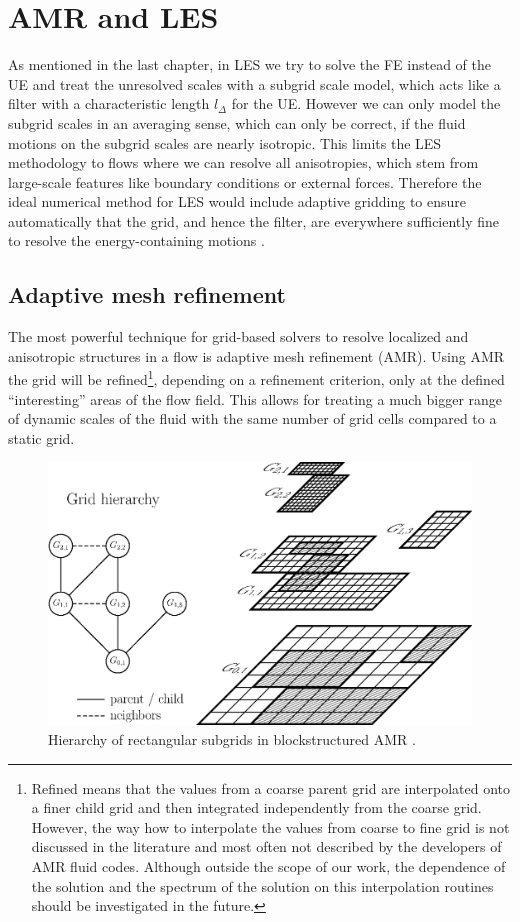 \chapter{AMR and LES}\label{amrles}
As mentioned in the last chapter, in LES we try to solve the FE
instead of the UE and treat the unresolved scales with a subgrid scale model,
which acts like a filter with a characteristic length $l_{\Delta}$ for the UE.
However we can only model the subgrid scales in an averaging sense, which can
only be correct, if the fluid motions on the subgrid scales are nearly
isotropic. This limits the LES methodology to flows where we can resolve all
anisotropies, which stem from large-scale features like boundary conditions or
external forces. Therefore the ideal numerical method for LES would include
adaptive gridding to ensure automatically that the grid, and hence the filter,
are everywhere sufficiently fine to resolve the energy-containing motions
\citep[p. 636]{Pope2000}.

\section{Adaptive mesh refinement}\label{amr}
The most powerful technique for grid-based solvers to resolve localized
and anisotropic structures in a flow is adaptive mesh refinement (AMR). 
Using AMR the grid will be refined\footnote{Refined means that the values from a
coarse parent grid are interpolated onto a finer child grid and then
integrated independently from the coarse grid. However, the way how to
interpolate the values from coarse to fine grid is not discussed in the
literature and most often not described by the developers of AMR fluid codes.
Although outside the scope of our work, the dependence of the solution and the
spectrum of the solution on this interpolation routines should be investigated
in the future.}, depending on a refinement criterion, only at
the defined ``interesting'' areas of the flow field. This allows for
treating a much bigger range of dynamic scales of the fluid with the same
number of grid cells compared to a static grid.

\begin{figure}[tp]
\centering
\includegraphics[width=0.7\linewidth]{chapter6/blockamr.eps}
\caption{Hierarchy of rectangular subgrids in blockstructured
AMR \citep{Deiterding2003}.}
\label{fig:amr}
\end{figure}

